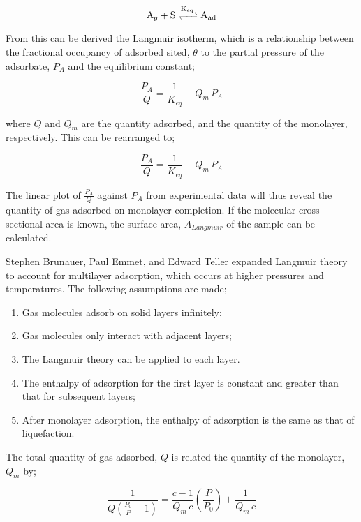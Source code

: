 \begin{equation}
    \ce{A_g + S <=>[K_{eq}] A_{ad}}
\end{equation}

From this can be derived the Langmuir isotherm, which is a relationship between the fractional occupancy of adsorbed sited, $\theta$ to the partial pressure of the \gls{adsorbate}, $P_A$ and the equilibrium constant; 

\begin{equation}
    \frac{P_A}{Q} = \frac{1}{K_{eq}} + Q_m \, P_A
\end{equation}

where $Q$ and $Q_m$ are the quantity adsorbed, and the quantity of the monolayer, respectively.\citep{Langmuir1916constitution, Langmuir1918adsorption} This can be rearranged to;

\begin{equation}
    \frac{P_A}{Q} = \frac{1}{K_{eq}} + Q_m \, P_A
\end{equation}

The linear plot of $\frac{P_A}{Q}$ against $P_A $ from experimental data will thus reveal the quantity of gas adsorbed on monolayer completion. If the molecular cross-sectional area is known, the surface area, $A_{Langmuir}$ of the sample can be calculated.

Stephen Brunauer, Paul Emmet, and Edward Teller expanded Langmuir theory to account for multilayer \gls{adsorption}, which occurs at higher pressures and temperatures. The following assumptions are made;

	\begin{enumerate}[label=(\arabic*)]
		\item Gas molecules adsorb on solid layers infinitely;
		\item Gas molecules only interact with adjacent layers;
		\item The Langmuir theory can be applied to each layer.
		\item The enthalpy of \gls{adsorption} for the first layer is constant and greater than that for subsequent layers;
		\item After monolayer \gls{adsorption}, the enthalpy of \gls{adsorption} is the same as that of liquefaction.
	\end{enumerate}

The total quantity of gas adsorbed, $Q$ is related the quantity of the monolayer, $Q_m$ by; 

\begin{equation} \label{eq:bet_plot}
    \frac{1}{Q  \left( \frac{P_0}{P} - 1 \right)} = \frac{c-1}{Q_m \, c}  \left( \frac{P}{P_0} \right) + \frac{1}{Q_m \, c}
\end{equation}

